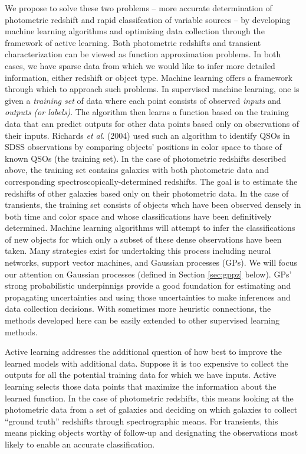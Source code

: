 \documentclass[prd, nofootinbib, floatfix, 12pt,tightenlines]{revtex4}
\begin{document}
We propose to solve these two problems -- more accurate determination of
photometric redshift and rapid classifcation of variable sources -- by
developing machine learning algorithms and optimizing data collection
through the framework of active learning.  Both photometric redshifts and
transient characterization can be viewed as function approximation
problems. In both cases, we have sparse data from which we would like to
infer more detailed information, either redshift or object type.  Machine
learning offers a framework through which to approach such problems.  In
supervised machine learning, one is given a {\it training set} of data
where each point consists of observed {\it inputs} and {\it outputs (or
  labels)}. The algorithm then learns a function based on the training
data that can predict outputs for other data points based only on
observations of their inputs.  Richards {\it et al}. (2004) used such an
algorithm to identify QSOs in SDSS observations by comparing objects'
positions in color space to those of known QSOs (the training set). In the
case of photometric redshifts described above, the training set contains
galaxies with both photometric data and corresponding
spectroscopically-determined redshifts.  The goal is to estimate the
redshifts of other galaxies based only on their photometric data.  In the
case of transients, the training set consists of objects whch have been
observed densely in both time and color space and whose classifications
have been definitively determined.  Machine learning algorithms will
attempt to infer the classifications of new objects for which only a subset
of these dense observations have been taken.  Many strategies exist for
undertaking this process including neural networks, support vector
machines, and Gaussian processes (GPs).  We will focus our attention on
Gaussian processes (defined in Section \ref{sec:gppz} below).  GPs' strong
probabilistic underpinnigs provide a good foundation for estimating and
propagating uncertainties and using those uncertainties to make inferences
and data collection decisions.  With sometimes more heuristic connections,
the methods developed here can be easily extended to other supervised
learning methods.

Active learning addresses the additional question of how best to improve
the learned models with additional data.  Suppose it is too expensive to
collect the outputs for all the potential training data for which we have
inputs.  Active learning selects those data points that maximize the
information about the learned function.  In the case of photometric
redshifts, this means looking at the photometric data from a set of
galaxies and deciding on which galaxies to collect ``ground truth''
redshifts through spectrographic means.  For transients, this means picking
objects worthy of follow-up and designating the observations most likely to
enable an accurate classification.
\end{document}
